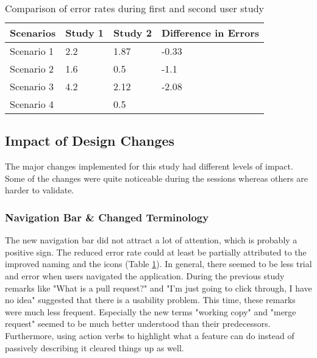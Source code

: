 \begin{table}[h!]
\centering
\begin{tabular}{|l|l|l|l|}
\hline
\rowcolor[HTML]{EFEFEF}
{\bf Scenarios} & {\bf Study 1} & {\bf Study 2} & {\bf Difference in Errors} \\ \hline
Scenario 1 & 2.2 & 1.87 & -0.33 \\ \hline
Scenario 2 & 1.6 & 0.5 & -1.1 \\ \hline
Scenario 3 & 4.2 & 2.12 & -2.08 \\ \hline
Scenario 4 &  & 0.5 &  \\ \hline
\end{tabular}
\caption{Comparison of error rates during first and second user study }
\label{table:second-study-error-rate}
\end{table}

\subsection{Impact of Design Changes}
The major changes implemented for this study had different levels of impact. Some of the changes were quite noticeable during the sessions whereas others are harder to validate.

\subsubsection{Navigation Bar \& Changed Terminology}
The new navigation bar did not attract a lot of attention, which is probably a positive sign. The reduced error rate could at least be partially attributed to the improved naming and the icons (Table \ref{table:second-study-error-rate}). In general, there seemed to be less trial and error when users navigated the application. During the previous study remarks like "What is a pull request?" and "I'm just going to click through, I have no idea" suggested that there is a usability problem. This time, these remarks were much less frequent. Especially the new terms "working copy" and "merge request" seemed to be much better understood than their predecessors. Furthermore, using action verbs to highlight what a feature can do instead of passively describing it cleared things up as well.


